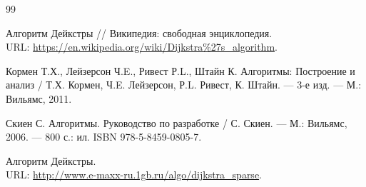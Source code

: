 \begin{thebibliography}{99}
	
	Алгоритм Дейкстры // Википедия: свободная энциклопедия. \\ 
	URL: \url{https://en.wikipedia.org/wiki/Dijkstra%27s_algorithm}. 

	Кормен Т.Х., Лейзерсон Ч.E., Ривест Р.L., Штайн К. Алгоритмы: Построение и анализ / Т.Х. Кормен, Ч.E. Лейзерсон, Р.L. Ривест, К. Штайн. --- 3-е изд. --- М.: Вильямс, 2011.

	Скиен С. Алгоритмы. Руководство по разработке / С. Скиен. --- М.: Вильямс, 2006. --- 800 с.: ил. ISBN 978-5-8459-0805-7.
	 
	Алгоритм Дейкстры. \\ 
	URL: \url{http://www.e-maxx-ru.1gb.ru/algo/dijkstra_sparse}.
	
\end{thebibliography}